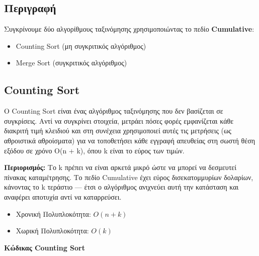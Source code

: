 \documentclass[a4paper,12pt]{article}
\begin{document}
	\subsection{Περιγραφή}
	
	Συγκρίνουμε δύο αλγορίθμους ταξινόμησης χρησιμοποιώντας το πεδίο \textbf{Cumulative}:
	
	\begin{itemize}
		\item Counting Sort (μη συγκριτικός αλγόριθμος)
		\item Merge Sort (συγκριτικός αλγόριθμος)
	\end{itemize}
	
	\subsection{Counting Sort}
	
	Ο Counting Sort είναι ένας αλγόριθμος ταξινόμησης που δεν βασίζεται σε συγκρίσεις. Αντί να συγκρίνει στοιχεία, μετράει πόσες φορές εμφανίζεται κάθε διακριτή τιμή κλειδιού και στη συνέχεια χρησιμοποιεί αυτές τις μετρήσεις (ως αθροιστικά αθροίσματα) για να τοποθετήσει κάθε εγγραφή απευθείας στη σωστή θέση εξόδου σε χρόνο O(n + k), όπου k είναι το εύρος των τιμών.
	
	\textbf{Περιορισμός:} Το k πρέπει να είναι αρκετά μικρό ώστε να μπορεί να δεσμευτεί πίνακας καταμέτρησης. Το πεδίο Cumulative έχει εύρος δισεκατομμυρίων δολαρίων, κάνοντας το k τεράστιο — έτσι ο αλγόριθμος ανιχνεύει αυτή την κατάσταση και αναφέρει αποτυχία αντί να καταρρεύσει.
	
	\begin{itemize}
		\item Χρονική Πολυπλοκότητα: $O(n + k)$
		\item Χωρική Πολυπλοκότητα: $O(k)$
	\end{itemize}
	
	\textbf{Κώδικας Counting Sort}
	
\end{document}
